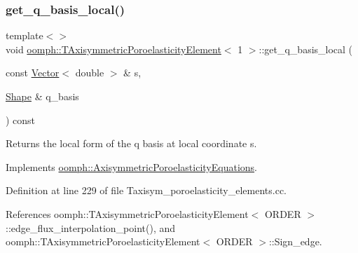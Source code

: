 \subsubsection{\texorpdfstring{get\+\_\+q\+\_\+basis\+\_\+local()}{get\_q\_basis\_local()}\hspace{0.1cm}{\footnotesize\ttfamily [2/3]}}
{\footnotesize\ttfamily template$<$$>$ \\
void \hyperlink{classoomph_1_1TAxisymmetricPoroelasticityElement}{oomph\+::\+T\+Axisymmetric\+Poroelasticity\+Element}$<$ 1 $>$\+::get\+\_\+q\+\_\+basis\+\_\+local (\begin{DoxyParamCaption}\item[{const \hyperlink{classoomph_1_1Vector}{Vector}$<$ double $>$ \&}]{s,  }\item[{\hyperlink{classoomph_1_1Shape}{Shape} \&}]{q\+\_\+basis }\end{DoxyParamCaption}) const\hspace{0.3cm}{\ttfamily [virtual]}}



Returns the local form of the q basis at local coordinate s. 



Implements \hyperlink{classoomph_1_1AxisymmetricPoroelasticityEquations_afe94aaa6d3af8c997c760465b6930c27}{oomph\+::\+Axisymmetric\+Poroelasticity\+Equations}.



Definition at line 229 of file Taxisym\+\_\+poroelasticity\+\_\+elements.\+cc.



References oomph\+::\+T\+Axisymmetric\+Poroelasticity\+Element$<$ O\+R\+D\+E\+R $>$\+::edge\+\_\+flux\+\_\+interpolation\+\_\+point(), and oomph\+::\+T\+Axisymmetric\+Poroelasticity\+Element$<$ O\+R\+D\+E\+R $>$\+::\+Sign\+\_\+edge.

\mbox{\label{classoomph_1_1TAxisymmetricPoroelasticityElement_a77621158dba7ea8d2095e4162c76583c}} 
